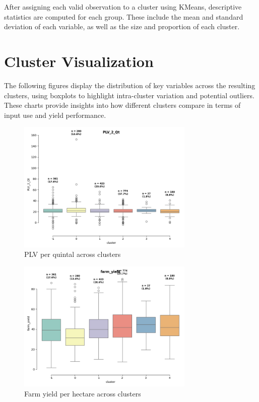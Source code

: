 \documentclass[a4paper,12pt]{article}
\begin{document}
After assigning each valid observation to a cluster using KMeans, descriptive statistics are computed for each group. These include the mean and standard deviation of each variable, as well as the size and proportion of each cluster.

\section{Cluster Visualization}

The following figures display the distribution of key variables across the resulting clusters, using boxplots to highlight intra-cluster variation and potential outliers. These charts provide insights into how different clusters compare in terms of input use and yield performance.

\begin{figure}[h!]
    \centering
    \includegraphics[width=0.75\textwidth]{clustering_pipeline/output/20250404_boxplot_PLV_2_Qt.png}
    \caption{PLV per quintal across clusters}
\end{figure}

\begin{figure}[h!]
    \centering
    \includegraphics[width=0.75\textwidth]{clustering_pipeline/output/20250404_boxplot_farm_yield.png}
    \caption{Farm yield per hectare across clusters}
\end{figure}
\end{document}
